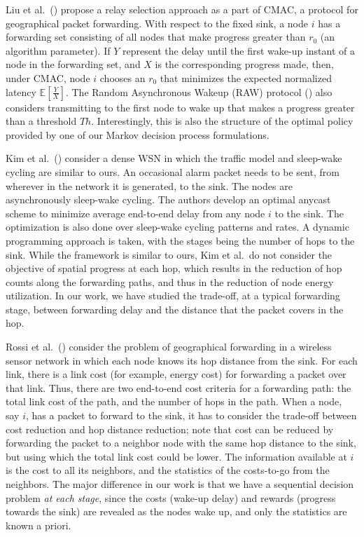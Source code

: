 \documentclass[onecolumn]{IEEEtran}
\begin{document}
Liu et al.\ (\cite{liu-etal07CMAC}) propose a relay selection approach
as a part of CMAC, a protocol for geographical packet forwarding. With
respect to the fixed sink, a node $i$ has a forwarding set consisting
of all nodes that make progress greater than $r_0$ (an algorithm
parameter). If $Y$ represent the delay until the first wake-up instant
of a node in the forwarding set, and $X$ is the corresponding progress
made, then, under CMAC, node $i$ chooses an $r_0$ that minimizes the
expected normalized latency $\mathbb{E}[\frac{Y}{X}]$. The Random
Asynchronous Wakeup (RAW) protocol (\cite{paruchuri-etal04RAW}) also
considers transmitting to the first node to wake up that makes a
progress greater than a threshold $Th$.  Interestingly, this is also the structure
of the optimal policy provided by one of our Markov decision process
formulations.

Kim et al.\ (\cite{kim-etal09optimal-anycast}) consider a dense WSN in
which the traffic model and sleep-wake cycling are similar to ours. An
occasional alarm packet needs to be sent, from wherever in the network
it is generated, to the sink. The nodes are asynchronously sleep-wake
cycling. The authors develop an optimal anycast scheme to minimize
average end-to-end delay from any node $i$ to the sink. The
optimization is also done over sleep-wake cycling patterns and rates.
A dynamic programming approach is taken, with the stages being the
number of hops to the sink. While the framework is similar to ours,
Kim et al.\ do not consider the objective of spatial progress at each
hop, which results in the reduction of hop counts along the forwarding
paths, and thus in the reduction of node energy utilization. In our
work, we have studied the trade-off, at a typical forwarding stage,
between forwarding delay and the distance that the packet covers in
the hop.

Rossi et al.\ (\cite{rossi-etal08SARA}) consider the problem of
geographical forwarding in a wireless sensor network in which each node
knows its hop distance from the sink. For each link, there is a link
cost (for example, energy cost) for forwarding a packet over that
link. Thus, there are two end-to-end cost criteria for a forwarding
path: the total link cost of the path, and the number of hops in the
path. When a node, say $i$, has a packet to forward to the sink, it
has to consider the trade-off between cost reduction and hop distance
reduction; note that cost can be reduced by forwarding the packet to a
neighbor node with the same hop distance to the sink, but using which
the total link cost could be lower.  The information available at $i$
is the cost to all its neighbors, and the statistics of the
costs-to-go from the neighbors. The major difference in our work is
that we have a sequential decision problem \emph{at each stage}, since
the costs (wake-up delay) and rewards (progress towards the sink) are
revealed as the nodes wake up, and only the statistics are known a
priori.
\end{document}
